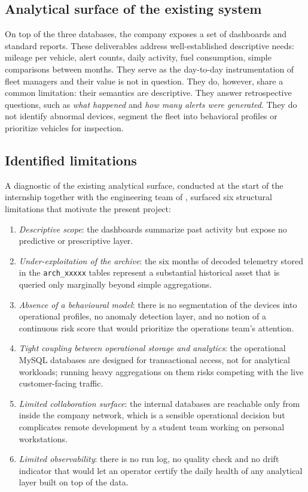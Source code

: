 \subsection{Analytical surface of the existing system}
On top of the three databases, the company exposes a set of dashboards and standard reports. These deliverables address well-established descriptive needs: mileage per vehicle, alert counts, daily activity, fuel consumption, simple comparisons between months. They serve as the day-to-day instrumentation of fleet managers and their value is not in question. They do, however, share a common limitation: their semantics are descriptive. They answer retrospective questions, such as \emph{what happened} and \emph{how many alerts were generated}. They do not identify abnormal devices, segment the fleet into behavioral profiles or prioritize vehicles for inspection.

\subsection{Identified limitations}
A diagnostic of the existing analytical surface, conducted at the start of the internship together with the engineering team of \hostorg, surfaced six structural limitations that motivate the present project:

\begin{enumerate}
    \item \emph{Descriptive scope}: the dashboards summarize past activity but expose no predictive or prescriptive layer.
    \item \emph{Under-exploitation of the archive}: the six months of decoded telemetry stored in the \texttt{arch\_xxxxx} tables represent a substantial historical asset that is queried only marginally beyond simple aggregations.
    \item \emph{Absence of a behavioural model}: there is no segmentation of the devices into operational profiles, no anomaly detection layer, and no notion of a continuous risk score that would prioritize the operations team's attention.
    \item \emph{Tight coupling between operational storage and analytics}: the operational MySQL databases are designed for transactional access, not for analytical workloads; running heavy aggregations on them risks competing with the live customer-facing traffic.
    \item \emph{Limited collaboration surface}: the internal databases are reachable only from inside the company network, which is a sensible operational decision but complicates remote development by a student team working on personal workstations.
    \item \emph{Limited observability}: there is no run log, no quality check and no drift indicator that would let an operator certify the daily health of any analytical layer built on top of the data.
\end{enumerate}


